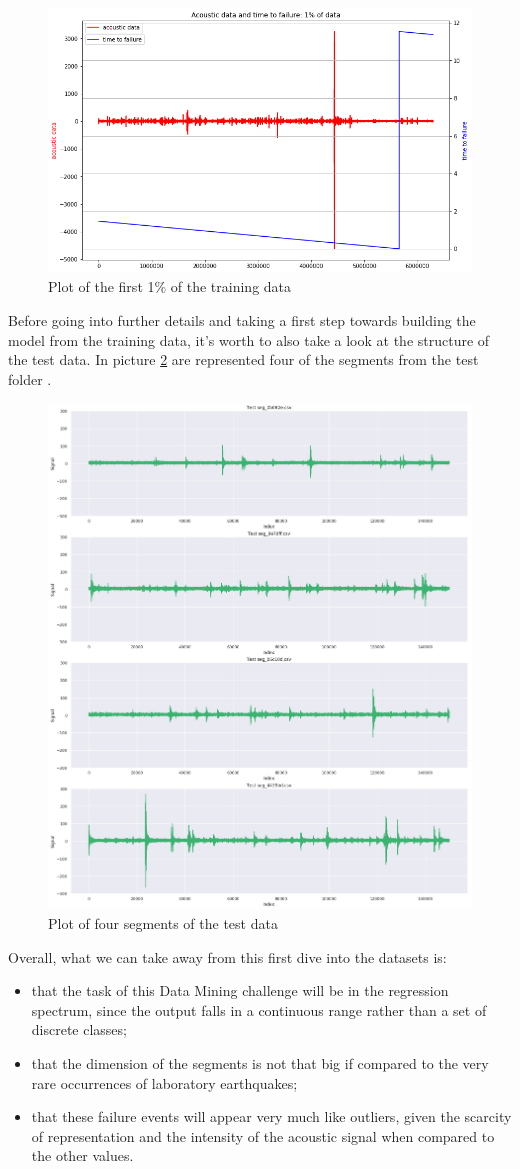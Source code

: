 \begin{figure} [h]
	\centering
	\includegraphics[width=0.7\linewidth]{pictures/plot2.png}
	\caption{Plot of the first 1\% of the training data}
	\label{fig:plot2}
\end{figure}

Before going into further details and taking a first step towards building the model from the training data, it's worth to also take a look at the structure of the test data. In picture \ref{fig:plot3} are represented four of the segments from the test folder \cite{kernelallunia}.

\begin{figure} [h]
	\centering
	\includegraphics[width=0.7\linewidth]{pictures/plot3.png}
	\caption{Plot of four segments of the test data}
	\label{fig:plot3}
\end{figure}

\bigbreak

Overall, what we can take away from this first dive into the datasets is:
\begin{itemize}
	\item that the task of this Data Mining challenge will be in the regression spectrum, since the output falls in a continuous range rather than a set of discrete classes;
	\item that the dimension of the segments is not that big if compared to the very rare occurrences of laboratory earthquakes;
	\item that these failure events will appear very much like outliers, given the scarcity of representation and the intensity of the acoustic signal when compared to the other values.
\end{itemize}

